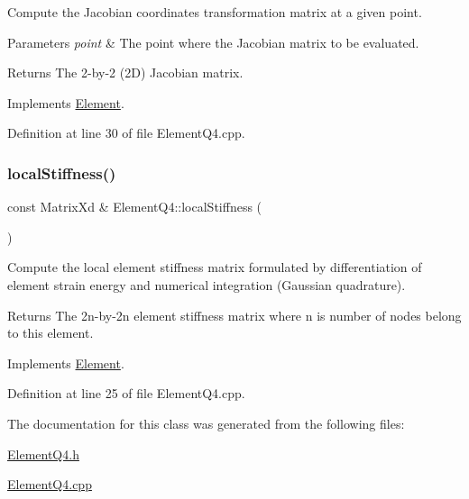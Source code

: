 Compute the Jacobian coordinates transformation matrix at a given point. 


\begin{DoxyParams}{Parameters}
{\em point} & The point where the Jacobian matrix to be evaluated. \\
\hline
\end{DoxyParams}
\begin{DoxyReturn}{Returns}
The 2-\/by-\/2 (2D) Jacobian matrix. 
\end{DoxyReturn}


Implements \mbox{\hyperlink{class_element_ad469c745f0bcb9d7a3431b1608c1ade6}{Element}}.



Definition at line 30 of file Element\+Q4.\+cpp.

\mbox{\label{class_element_q4_a9a127fdfd6f80efe3c35f20d7b1296cf}} 
\subsubsection{\texorpdfstring{local\+Stiffness()}{localStiffness()}}
{\footnotesize\ttfamily const Matrix\+Xd \& Element\+Q4\+::local\+Stiffness (\begin{DoxyParamCaption}{ }\end{DoxyParamCaption})\hspace{0.3cm}{\ttfamily [virtual]}}



Compute the local element stiffness matrix formulated by differentiation of element strain energy and numerical integration (Gaussian quadrature). 

\begin{DoxyReturn}{Returns}
The 2n-\/by-\/2n element stiffness matrix where n is number of nodes belong to this element. 
\end{DoxyReturn}


Implements \mbox{\hyperlink{class_element_a603fbe060b5d6979506f0d2130e6c171}{Element}}.



Definition at line 25 of file Element\+Q4.\+cpp.



The documentation for this class was generated from the following files\+:\begin{DoxyCompactItemize}
\item 
\mbox{\hyperlink{_element_q4_8h}{Element\+Q4.\+h}}\item 
\mbox{\hyperlink{_element_q4_8cpp}{Element\+Q4.\+cpp}}\end{DoxyCompactItemize}
